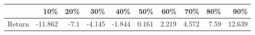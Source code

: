 \begin{tabular}{lrrrrrrrrr}
\toprule
{} &     10\% &  20\% &    30\% &    40\% &    50\% &    60\% &    70\% &   80\% &     90\% \\
\midrule
Return & -11.862 & -7.1 & -4.145 & -1.844 &  0.161 &  2.219 &  4.572 &  7.59 &  12.639 \\
\bottomrule
\end{tabular}
